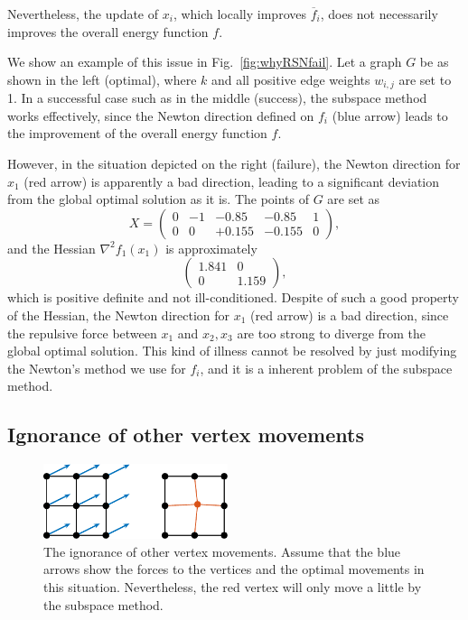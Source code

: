 \documentclass[dvipdfmx,journal]{IEEEtran}
\begin{document}
Nevertheless, the update of $x_i$, which locally improves $\overline{f}_i$, does not necessarily improves the overall energy function $f$.

We show an example of this issue in Fig.~\ref{fig:whyRSNfail}.
Let a graph $G$ be as shown in the left (optimal), where $k$ and all positive edge weights $w_{i,j}$ are set to 1.
In a successful case such as in the middle (success), the subspace method works effectively, since the Newton direction defined on $f_i$ (blue arrow) leads to the improvement of the overall energy function $f$.

However, in the situation depicted on the right (failure), the Newton direction for $x_1$ (red arrow) is apparently a bad direction, leading to a significant deviation from the global optimal solution as it is.
The points of $G$ are set as
\begin{equation*}
    X = \begin{pmatrix}
        0 & -1 & -0.85  & -0.85  & 1 \\
        0 & 0  & +0.155 & -0.155 & 0
    \end{pmatrix},
\end{equation*}
and the Hessian $\nabla^2 f_1(x_1)$ is approximately
\begin{equation*}
    \begin{pmatrix}
        1.841 & 0     \\
        0     & 1.159
    \end{pmatrix},
\end{equation*}
which is positive definite and not ill-conditioned.
Despite of such a good property of the Hessian, the Newton direction for $x_1$ (red arrow) is a bad direction, since the repulsive force between $x_1$ and $x_2,x_3$ are too strong to diverge from the global optimal solution.
This kind of illness cannot be resolved by just modifying the Newton's method we use for $f_i$, and it is a inherent problem of the subspace method.

\subsection{Ignorance of other vertex movements}\label{ssec:ignorance}

\begin{figure}[t]
    \centering
    \includegraphics[height=2.2cm]{whyRSNfail2/whyRSNfail2.pdf}
    \caption{
        The ignorance of other vertex movements. Assume that the blue arrows show the forces to the vertices and the optimal movements in this situation. Nevertheless, the red vertex will only move a little by the subspace method.
    }
    \label{fig:whyRSNfail2}
\end{figure}
\end{document}
